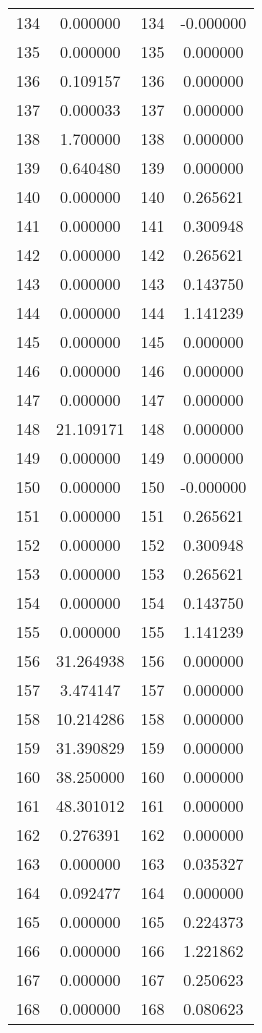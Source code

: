 \documentclass[12pt]{article}
\begin{document}
\begin{longtable}{@{}cccc@{}}
134 & 0.000000 & 134 & -0.000000 \\
135 & 0.000000 & 135 & 0.000000 \\
136 & 0.109157 & 136 & 0.000000 \\
137 & 0.000033 & 137 & 0.000000 \\
138 & 1.700000 & 138 & 0.000000 \\
139 & 0.640480 & 139 & 0.000000 \\
140 & 0.000000 & 140 & 0.265621 \\
141 & 0.000000 & 141 & 0.300948 \\
142 & 0.000000 & 142 & 0.265621 \\
143 & 0.000000 & 143 & 0.143750 \\
144 & 0.000000 & 144 & 1.141239 \\
145 & 0.000000 & 145 & 0.000000 \\
146 & 0.000000 & 146 & 0.000000 \\
147 & 0.000000 & 147 & 0.000000 \\
148 & 21.109171 & 148 & 0.000000 \\
149 & 0.000000 & 149 & 0.000000 \\
150 & 0.000000 & 150 & -0.000000 \\
151 & 0.000000 & 151 & 0.265621 \\
152 & 0.000000 & 152 & 0.300948 \\
153 & 0.000000 & 153 & 0.265621 \\
154 & 0.000000 & 154 & 0.143750 \\
155 & 0.000000 & 155 & 1.141239 \\
156 & 31.264938 & 156 & 0.000000 \\
157 & 3.474147 & 157 & 0.000000 \\
158 & 10.214286 & 158 & 0.000000 \\
159 & 31.390829 & 159 & 0.000000 \\
160 & 38.250000 & 160 & 0.000000 \\
161 & 48.301012 & 161 & 0.000000 \\
162 & 0.276391 & 162 & 0.000000 \\
163 & 0.000000 & 163 & 0.035327 \\
164 & 0.092477 & 164 & 0.000000 \\
165 & 0.000000 & 165 & 0.224373 \\
166 & 0.000000 & 166 & 1.221862 \\
167 & 0.000000 & 167 & 0.250623 \\
168 & 0.000000 & 168 & 0.080623 \\

\end{longtable}
\end{document}
